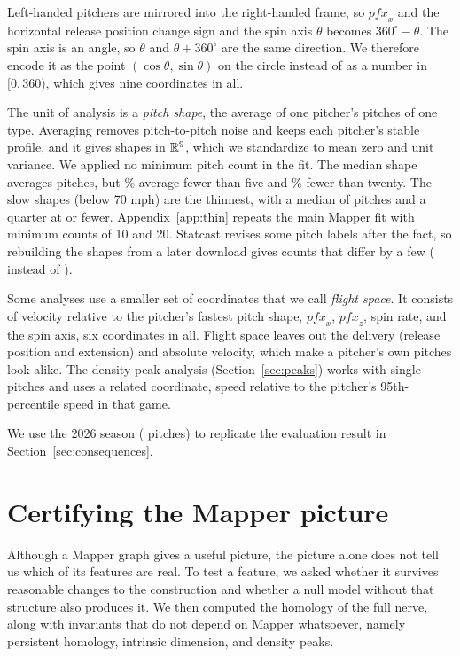 \documentclass{article}
\newcommand{\R}{\mathbb{R}}
\theoremstyle{definition}
\theoremstyle{remark}
\begin{document}
Left-handed pitchers are mirrored into the right-handed frame, so $\mathit{pfx}_x$ and the horizontal release position change sign and the spin axis $\theta$ becomes $360^\circ - \theta$.
The spin axis is an angle, so $\theta$ and $\theta + 360^\circ$ are the same direction. We therefore encode it as the point $(\cos\theta, \sin\theta)$ on the circle instead of as a number in $[0, 360)$, which gives nine coordinates in all.

The unit of analysis is a \emph{pitch shape}, the average of one pitcher's pitches of one type.
Averaging removes pitch-to-pitch noise and keeps each pitcher's stable profile, and it gives \NShapes{} shapes in $\R^{\NFeatures}$, which we standardize to mean zero and unit variance.
We applied no minimum pitch count in the fit. The median shape averages \MedianPitches{} pitches, but \PctLtFive\% average fewer than five and \PctLtTwenty\% fewer than twenty. The \NSlow{} slow shapes (below 70 mph) are the thinnest, with a median of \SlowMedian{} pitches and a quarter at \SlowQ{} or fewer.
Appendix~\ref{app:thin} repeats the main Mapper fit with minimum counts of 10 and 20.
Statcast revises some pitch labels after the fact, so rebuilding the shapes from a later download gives counts that differ by a few (\SSOneShapes{} instead of \NShapes).

Some analyses use a smaller set of coordinates that we call \emph{flight space}.
It consists of velocity relative to the pitcher's fastest pitch shape, $\mathit{pfx}_x$, $\mathit{pfx}_z$, spin rate, and the spin axis, six coordinates in all.
Flight space leaves out the delivery (release position and extension) and absolute velocity, which make a pitcher's own pitches look alike.
The density-peak analysis (Section~\ref{sec:peaks}) works with single pitches and uses a related coordinate, speed relative to the pitcher's 95th-percentile speed in that game.

We use the 2026 season (\NPitchesTwentySix{} pitches) to replicate the evaluation result in Section~\ref{sec:consequences}.

\section{Certifying the Mapper picture}\label{sec:certify}
Although a Mapper graph gives a useful picture, the picture alone does not tell us which of its features are real.
To test a feature, we asked whether it survives reasonable changes to the construction and whether a null model without that structure also produces it.
We then computed the homology of the full nerve, along with invariants that do not depend on Mapper whatsoever, namely persistent homology, intrinsic dimension, and density peaks.
\end{document}
